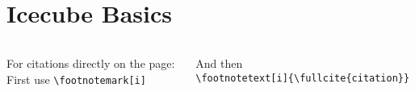 \section{Icecube Basics}
\begin{frame}{}
    \begin{columns}[]
        \begin{column}{.5\textwidth}
            For citations directly on the page:\\
            First use \texttt{\small \backslash footnotemark[i]} \footnotemark[1]
        \end{column}
        \begin{column}{.5\linewidth}
            And then\\
            \texttt{\small \backslash footnotetext[i]\{\backslash fullcite\{citation\}\}}
        \end{column}
    \end{columns}

\end{frame}
